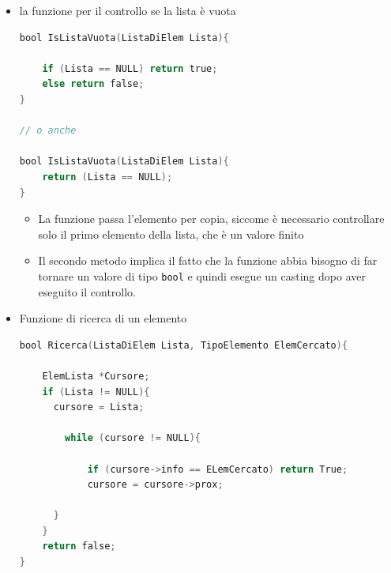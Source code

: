 \documentclass[
  paper=a4,
  oneside  ,captions=tableheading
]{scrbook}
\newcommand{\passthrough}[1]{#1}
\providecommand{\tightlist}{%
  \setlength{\itemsep}{0pt}\setlength{\parskip}{0pt}}
\begin{document}
\begin{itemize}
\item
  la funzione per il controllo se la lista è vuota

\begin{lstlisting}[language=C]
bool IsListaVuota(ListaDiElem Lista){

    if (Lista == NULL) return true;
    else return false;
}

// o anche

bool IsListaVuota(ListaDiElem Lista){
    return (Lista == NULL);
}
\end{lstlisting}

  \begin{itemize}
  \tightlist
  \item
    La funzione passa l'elemento per copia, siccome è necessario
    controllare solo il primo elemento della lista, che è un valore
    finito
  \item
    Il secondo metodo implica il fatto che la funzione abbia bisogno di
    far tornare un valore di tipo \passthrough{\lstinline!bool!} e
    quindi esegue un casting dopo aver eseguito il controllo.
  \end{itemize}
\item
  Funzione di ricerca di un elemento

\begin{lstlisting}[language=C]
bool Ricerca(ListaDiElem Lista, TipoElemento ElemCercato){

    ElemLista *Cursore;
    if (Lista != NULL){
      cursore = Lista;

        while (cursore != NULL){

            if (cursore->info == ELemCercato) return True;
            cursore = cursore->prox;

      }
    }
    return false; 
}
\end{lstlisting}


\end{itemize}
\end{document}

